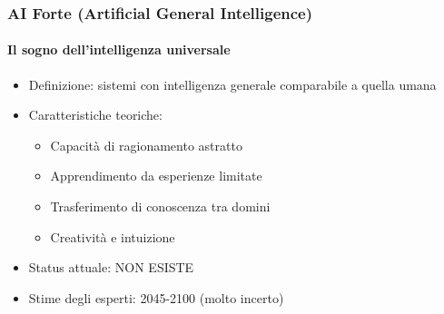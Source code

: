 %
\begin{frame}[t,fragile] \frametitle{AI Forte (Artificial General Intelligence)}
	{\scriptsize
		\onslide<1->
            \framesubtitle{Il sogno dell'intelligenza universale}
            \vspace*{-10pt}
	    	\begin{minipage}[t]{\textwidth}
				\begin{minipage}[t]{0.6\textwidth}
	    			\begin{itemize}[leftmargin=10pt,align=right]
						\onslide<2->\item[\alert{\faHandORight}] \alert{Definizione:} sistemi con \alert{intelligenza generale} comparabile a quella umana
						\onslide<3->\item[\alert{\faHandORight}] \alert{Caratteristiche teoriche:}
						\begin{itemize}[leftmargin=10pt,align=right]
							\item[\alert{\faHandORight}] Capacità di ragionamento astratto
							\item[\alert{\faHandORight}] Apprendimento da esperienze limitate
							\item[\alert{\faHandORight}] Trasferimento di conoscenza tra domini
							\item[\alert{\faHandORight}] Creatività e intuizione
						\end{itemize}
						\item[\alert{\faHandORight}] \alert{Status attuale:} \alert{NON ESISTE}
						\onslide<5->\item[\alert{\faHandORight}] \alert{Stime degli esperti:} 2045-2100 (molto incerto)
					\end{itemize}
            	\end{minipage}
            	\begin{minipage}[t]{0.4\textwidth}
                	\centering
            	\end{minipage}
	    	\end{minipage}
	}
\end{frame}
%

